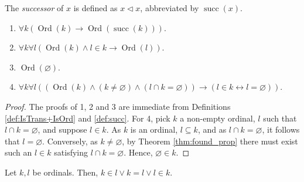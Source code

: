 \begin{definition}[Successor]
    \label{def:succ}
    \leanok
    The \textit{successor} of $x$ is defined as $x \lhd x$, abbreviated by $\operatorname{succ}(x)$.
\end{definition}

\begin{lemma}
    \label{lem:IsOrd.succ_isOrd+...+IsOrd.empty_is_mem}
    \leanok
    \leavevmode
    \begin{enumerate}
        \item $\forall k(\operatorname{Ord}(k) \rightarrow 
        \operatorname{Ord}(\operatorname{succ}(k)))$.
        \item $\forall k \forall l(\operatorname{Ord}(k) \land l \in k \rightarrow 
        \operatorname{Ord}(l))$.
        \item $\operatorname{Ord}(\varnothing)$.
        \item $\forall k \forall l ((\operatorname{Ord}(k) \land (k \neq \varnothing) \land 
        (l \cap k = \varnothing))\rightarrow(l \in k \leftrightarrow l = \varnothing))$.
    \end{enumerate}
\end{lemma}

\begin{proof}
    \leanok
    \leavevmode
    The proofs of 1, 2 and 3 are immediate from Definitions \ref{def:IsTrans+IsOrd} and 
    \ref{def:succ}.
    For 4, pick $k$ a non-empty ordinal, $l$ such that $l \cap k = \varnothing$, 
    and suppose $l \in k$. As $k$ is an ordinal, $l \subseteq k$, and as $l \cap k = \varnothing$, 
    it follows that $l=\varnothing$.
    Conversely, as $k \neq \varnothing$, by Theorem \ref{thm:found_prop} there must exist such 
    an $l \in k$ satisfying $l \cap k = \varnothing$. Hence, $\varnothing \in k$.
\end{proof}

\begin{theorem}
    \label{thm:IsOrd.comparability}
    \leanok
    Let $k,l$ be ordinals. Then, $k \in l \lor k = l \lor l \in k$.
\end{theorem}


